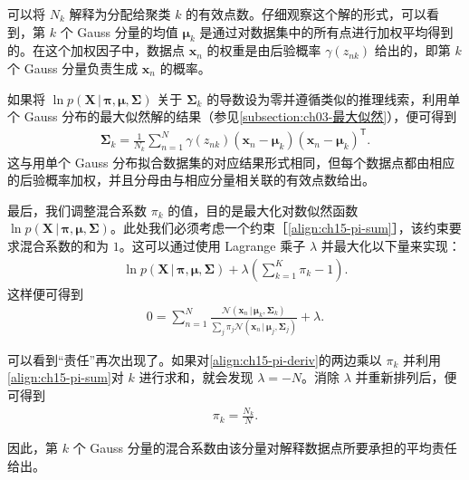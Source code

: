 \documentclass[../../main.tex]{subfiles}
\begin{document}
可以将 $N_k$ 解释为分配给聚类 $k$ 的有效点数。仔细观察这个解的形式，可以看到，第 $k$ 个 Gauss 分量的均值 $\bm{\mu}_k$ 是通过对数据集中的所有点进行加权平均得到的。在这个加权因子中，数据点 $\bm{x}_n$ 的权重是由后验概率 $\gamma(z_{nk})$ 给出的，即第 $k$ 个 Gauss 分量负责生成 $\bm{x}_n$ 的概率。

如果将 $\ln p(\bm{X}\,|\,\bm{\pi},\bm{\mu},\bm{\Sigma})$ 关于 $\bm{\Sigma}_k$ 的导数设为零并遵循类似的推理线索，利用单个 Gauss 分布的最大似然解的结果（参见\cref{subsection:ch03-最大似然}），便可得到
\begin{align}
\bm{\Sigma}_k=\frac{1}{N_k}\sum_{n=1}^{N}\gamma(z_{nk})(\bm{x}_n-\bm{\mu}_k)(\bm{x}_n-\bm{\mu}_k)^{\mathsf T}.
\label{align:ch15-sigma-update}
\end{align}
这与用单个 Gauss 分布拟合数据集的对应结果形式相同，但每个数据点都由相应的后验概率加权，并且分母由与相应分量相关联的有效点数给出。

最后，我们调整混合系数 $\pi_k$ 的值，目的是最大化对数似然函数 $\ln p(\bm{X}\,|\,\bm{\pi},\bm{\mu},\bm{\Sigma})$。此处我们必须考虑一个约束［\eqref{align:ch15-pi-sum}］，该约束要求混合系数的和为 $1$。这可以通过使用 Lagrange 乘子 $\lambda$ 并最大化以下量来实现：
\begin{align}
\ln p(\bm{X}\,|\,\bm{\pi},\bm{\mu},\bm{\Sigma})+\lambda\!\left(\sum_{k=1}^{K}\pi_k-1\right).
\label{align:ch15-lagrangian}
\end{align}
这样便可得到
\begin{align}
0=\sum_{n=1}^{N}\frac{\mathcal{N}(\bm{x}_n\,|\,\bm{\mu}_k,\bm{\Sigma}_k)}{\sum_j\pi_j\mathcal{N}(\bm{x}_n\,|\,\bm{\mu}_j,\bm{\Sigma}_j)}+\lambda.
\label{align:ch15-pi-deriv}
\end{align}

可以看到“责任”再次出现了。如果对\eqref{align:ch15-pi-deriv}的两边乘以 $\pi_k$ 并利用\eqref{align:ch15-pi-sum}对 $k$ 进行求和，就会发现 $\lambda=-N$。消除 $\lambda$ 并重新排列后，便可得到
\begin{align}
\pi_k=\frac{N_k}{N}.
\label{align:ch15-pi-update}
\end{align}

因此，第 $k$ 个 Gauss 分量的混合系数由该分量对解释数据点所要承担的平均责任给出。
\end{document}
